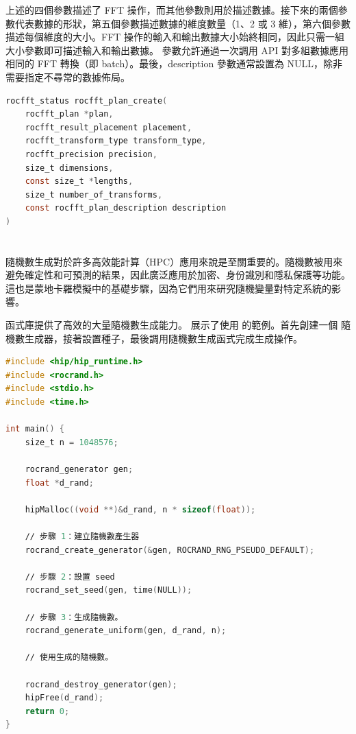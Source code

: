 上述的四個參數描述了 FFT 操作，而其他參數則用於描述數據。接下來的兩個參數代表數據的形狀，第五個參數描述數據的維度數量（1、2 或 3 維），第六個參數描述每個維度的大小。FFT 操作的輸入和輸出數據大小始終相同，因此只需一組大小參數即可描述輸入和輸出數據。 參數允許通過一次調用  API 對多組數據應用相同的 FFT 轉換（即 batch）。最後，description 參數通常設置為 NULL，除非需要指定不尋常的數據佈局。

\begin{lstlisting}[language=C, caption={\term{rocfft\_plan\_create} 函式的部署。}, captionpos=t, label={lst:Signature}]
rocfft_status rocfft_plan_create(
    rocfft_plan *plan,
    rocfft_result_placement placement,
    rocfft_transform_type transform_type,
    rocfft_precision precision,
    size_t dimensions,
    const size_t *lengths,
    size_t number_of_transforms,
    const rocfft_plan_description description
)
\end{lstlisting}

\section{}
隨機數生成對於許多高效能計算（HPC）應用來說是至關重要的。隨機數被用來避免確定性和可預測的結果，因此廣泛應用於加密、身份識別和隱私保護等功能。這也是蒙地卡羅模擬中的基礎步驟，因為它們用來研究隨機變量對特定系統的影響。

 函式庫提供了高效的大量隨機數生成能力。 展示了使用  的範例。首先創建一個  隨機數生成器，接著設置種子，最後調用隨機數生成函式完成生成操作。

\begin{lstlisting}[language=C, caption={一個生成 100 萬個偽隨機數的 \term{rocRAND} 函式。}, captionpos=t, label={lst:rocRAND}]
#include <hip∕hip_runtime.h>
#include <rocrand.h>
#include <stdio.h>
#include <time.h>

int main() {
    size_t n = 1048576;

    rocrand_generator gen;
    float *d_rand;

    hipMalloc((void **)&d_rand, n * sizeof(float));

    ∕∕ 步驟 1：建立隨機數產生器
    rocrand_create_generator(&gen, ROCRAND_RNG_PSEUDO_DEFAULT);

    ∕∕ 步驟 2：設置 seed
    rocrand_set_seed(gen, time(NULL));

    ∕∕ 步驟 3：生成隨機數。
    rocrand_generate_uniform(gen, d_rand, n);

    ∕∕ 使用生成的隨機數。

    rocrand_destroy_generator(gen);
    hipFree(d_rand);
    return 0;
}
\end{lstlisting}

